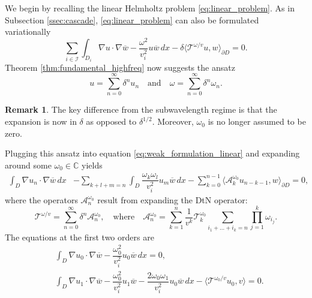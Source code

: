 \documentclass[a4paper,reqno,twoside]{amsart}
\numberwithin{equation}{section}
\theoremstyle{definition}
\newtheorem{remark}[theorem]{Remark}
\newcommand{\<}{\ensuremath \leq}
\renewcommand{\>}{\ensuremath \geq}
\begin{document}
We begin by recalling the linear Helmholtz problem \eqref{eq:linear_problem}.
As in Subsection \ref{ssec:cascade}, \eqref{eq:linear_problem} can also be formulated variationally
\begin{equation}\label{eq:weak_formulation_linear}
    \sum_{i\in \mathcal{I}}\int_{D_i}\nabla u \cdot\nabla \overline{w} - \frac{\omega^2}{v_i^2}u\overline{w} \,dx - \delta \langle \mathcal{T}^{\omega/v} u, w\rangle_{\partial D} = 0.
\end{equation}
Theorem \ref{thm:fundamental_highfreq} now suggests the ansatz
\begin{equation}\label{eq:power_series_highfreq}
    u = \sum_{n=0}^\infty \delta^{n} u_n \quad \text{and} \quad \omega = \sum_{n=0}^\infty \delta^{n} \omega_n.
\end{equation}
\begin{remark}
    The key difference from the subwavelength regime is that the expansion is now in $\delta$ as opposed to $\delta^{1/2}$. Moreover, $\omega_0$ is no longer assumed to be zero. 
\end{remark}
Plugging this ansatz into equation \eqref{eq:weak_formulation_linear} and expanding around some $\omega_0\in\mathbb{C}$ yields
\begin{equation}\label{eq:cascade_linear1}
    \begin{aligned}
        \int_{D} \nabla u_n \cdot \nabla \overline{w} \, dx 
        &- \sum_{k+l+m=n}\int_D \dfrac{\omega_k\omega_l}{v_i^2} u_m \overline{w} \, dx - \sum_{k=0}^{n-1}\langle\mathcal{A}_k^{\omega_0} u_{n-k-1},w\rangle_{\partial D} = 0,
    \end{aligned}
\end{equation}
where the operators $\mathcal{A}_n^{\omega_0}$ result from expanding the DtN operator:
\begin{equation}
    \mathcal{T}^{\omega/v} = \sum_{n=0}^\infty \delta^{n} \mathcal{A}_n^{\omega_0}, \quad \text{where} \quad \mathcal{A}_n^{\omega_0} = \sum_{k=1}^n \frac{1}{v^k}\mathcal{T}_k^{\omega_0} \sum _{i_1 + \dots+i_k=n}\prod_{j=1}^k\omega_{i_j}.
\end{equation}
The equations at the first two orders are
\begin{align}
    &\int_{D} \nabla u_0 \cdot \nabla \overline{w} -\dfrac{\omega_0^2}{v_i^2} u_0 \overline{w} \, dx  = 0,\\
    &\int_{D} \nabla u_1 \cdot \nabla \overline{w} -\dfrac{\omega_0^2}{v_i^2} u_1\overline{w} - \dfrac{2\omega_0\omega_1}{v_i^2}u_0 \overline{w} \, dx  -\langle \mathcal{T}^{\omega_0/v}u_0,v\rangle= 0.
\end{align}
\end{document}
